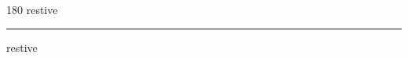 
\begin{frame}
\begin{center}
\begin{turn}{180}
{\fontsize{2.5cm}{1em}\selectfont restive}
\end{turn}
\vspace{1em}\par  
\hrule
\vspace{1em}\par  
{\fontsize{2.5cm}{1em}\selectfont restive}
\end{center}
\end{frame}
